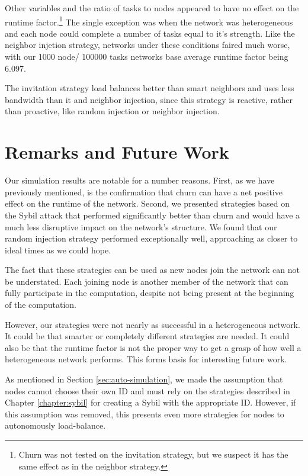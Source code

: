Other variables and the ratio of tasks to nodes appeared to have no effect on the runtime factor.\footnote{Churn was not tested on the invitation strategy, but we suspect it has the same effect as in the neighbor strategy.}
The single exception was when the network was heterogeneous and each node could complete a number of tasks equal to it's strength.
Like the neighbor injetion strategy, networks under these conditions faired much worse, with our 1000 node/ 100000 tasks networks base average runtime factor being 6.097.

The invitation strategy load balances better than smart neighbors and uses less bandwidth than it and neighbor injection, since this strategy is reactive, rather than proactive, like random injection or neighbor injection.

\section{Remarks and Future Work}
Our simulation results are notable for a number reasons.
First, as we have previously mentioned, is the confirmation that churn can have a net positive effect on the runtime of the network.
Second, we presented strategies based on the Sybil attack that performed significantly better than churn and would have a much less disruptive impact on the network's structure.
We found that our random injection strategy performed exceptionally well, approaching as closer to ideal times as we could hope.


The fact that these strategies can be used as new nodes join the network can not be understated.
Each joining node is another member of the network that can fully participate in the computation, despite not being present at the beginning of the computation.

However, our strategies were not nearly as successful in a heterogeneous network.
It could be that smarter or completely different strategies are needed.
It could also be that the runtime factor is not the proper way to get a grasp of how well a heterogeneous network performs.
This forms basis for interesting future work.


As mentioned in Section \ref{sec:auto-simulation}, we made the assumption that nodes cannot choose their own ID and must rely on the strategies described in Chapter \ref{chapter:sybil}  \cite{sybil-analysis} for creating a Sybil with the appropriate ID.
However, if this assumption was removed, this presents even more strategies for nodes to autonomously load-balance.